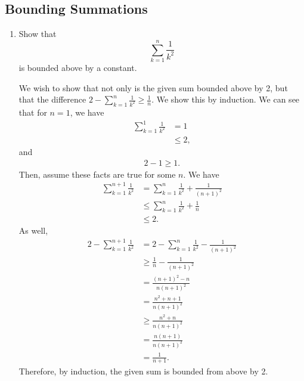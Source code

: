 \documentclass[AppendixA]{subfiles}
\begin{document}
	\subsection{Bounding Summations}

	\begin{enumerate}
		\item Show that
		\[
			\sum_{k = 1}^n \frac{1}{k^2}
		\]
		is bounded above by a constant.
		\begin{answer}
			We wish to show that not only is the given sum bounded above by 2, but that the difference $2 - \sum_{k = 1}^n \frac{1}{k^2} \geq \frac{1}{n}$. We show this by induction. We can see that for $n = 1$, we have
			\begin{align*}
				\sum_{k = 1}^1 \frac{1}{k^2} &= 1\\
					&\leq 2,
			\end{align*}
			and
			\begin{align*}
				2 - 1 \geq 1.
			\end{align*}
			Then, assume these facts are true for some $n$. We have
			\begin{align*}
				\sum_{k = 1}^{n + 1} \frac{1}{k^2} &= \sum_{k = 1}^n \frac{1}{k^2} + \frac{1}{(n + 1)^2}\\
					&\leq \sum_{k = 1}^n \frac{1}{k^2} + \frac{1}{n}\\
					&\leq 2.
			\end{align*}
			As well,
			\begin{align*}
				2 - \sum_{k = 1}^{n + 1} \frac{1}{k^2} &= 2 - \sum_{k = 1}^n \frac{1}{k^2} - \frac{1}{(n + 1)^2}\\
					&\geq \frac{1}{n} - \frac{1}{(n + 1)^2}\\
					&= \frac{(n+1)^2 - n}{n(n + 1)^2}\\
					&= \frac{n^2 + n + 1}{n(n + 1)^2}\\
					&\geq \frac{n^2 + n}{n(n + 1)^2}\\
					&= \frac{n(n + 1)}{n(n + 1)^2}\\
					&= \frac{1}{n + 1}.
			\end{align*}
			Therefore, by induction, the given sum is bounded from above by 2.
		\end{answer}


\end{enumerate}
\end{document}

